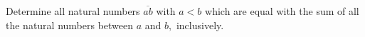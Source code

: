 Determine all natural numbers $ \overline{ab} $ with $ a<b $ which are equal with the sum of all the natural numbers between $ a $ and $ b, $ inclusively.